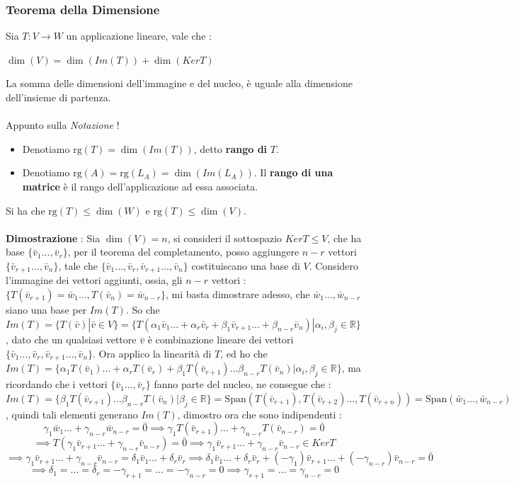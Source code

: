 \documentclass[12pt, letterpaper]{article}
\newcommand{\R}{{\mathbb R}}
\newcommand{\rg}{{\text{rg}}}
\newcommand{\ve}{{\bar v}}
\newcommand{\acc}{\\\hphantom{}\\}
\newcommand{\Span}{{\text{Span}}}
\begin{document}
\subsubsection{Teorema della Dimensione}
Sia \(T:V\rightarrow W\) un applicazione lineare, vale che :\begin{center}
    \(\dim(V)=\dim(Im(T))+\dim(KerT)\)
\end{center}
La somma delle dimensioni dell'immagine e del nucleo, è uguale alla dimensione dell'insieme di partenza.\acc
    Appunto sulla \textit{Notazione} ! \begin{itemize}
        \item Denotiamo \(\rg(T)=\dim(Im(T))\), detto \textbf{rango di }\(T\).
        \item Denotiamo \(\rg(A)=\rg(L_A)=\dim(Im(L_A))\). Il \textbf{rango di una matrice} è il rango dell'applicazione ad essa associata.
    \end{itemize}
Si ha che \(\rg(T)\le \dim(W)\) e \(\rg(T)\le\dim(V)\).\acc 
\textbf{Dimostrazione }: 
Sia \(\dim(V)=n\), si consideri il sottospazio \(KerT\le V\), che ha base \(\{\ve_1\dots,\ve_r\}\), per il teorema del completamento, posso aggiungere 
\(n-r\) vettori \(\{\ve_{r+1}\dots,\ve_n\}\), tale che \(\{\ve_1\dots,\ve_r,\ve_{r+1}\dots,\ve_n\}\) costituiscano una base 
di \(V\). Considero l'immagine dei vettori aggiunti, ossia, gli \(n-r\) vettori : \(\{T(\ve_{r+1})=\bar w_1\dots,T(\ve_n)=\bar w_{n-r}\}\),
mi basta dimostrare adesso, che \(\bar w_1\dots,\bar w_{n-r}\) siano una base per \(Im(T)\). So che \(Im(T)=\{T(\ve)|\ve\in V\}=
\{T(\alpha_1\ve_1\dots +\alpha_r\ve_r+\beta_1\ve_{r+1}\dots+\beta_{n-r}\ve_n)|\alpha_i,\beta_j\in\R\}\), dato che 
un qualsiasi vettore \(\ve\) è combinazione lineare dei vettori  \(\{\ve_1\dots,\ve_r,\ve_{r+1}\dots,\ve_n\}\). Ora applico la linearità
di \(T\), ed ho che \(Im(T)=\{\alpha_1T(\ve_1)\dots+\alpha_rT(\ve_r)+\beta_1T(\ve_{r+1})\dots\beta_{n-r}T(\ve_n)|\alpha_i,\beta_j\in\R\}\), ma 
ricordando che i vettori  \(\{\ve_1\dots,\ve_r\}\) fanno parte del nucleo, ne consegue che : 
\(Im(T)=\{\beta_1T(\ve_{r+1})\dots\beta_{n-r}T(\ve_n)|\beta_j\in\R\}=\Span(T(\ve_{r+1}),T(\ve_{r+2})\dots,T(\ve_{r+n}))=
\Span(\bar w_1\dots,\bar w_{n-r})\), quindi tali elementi generano \(Im(T)\), dimostro ora che sono indipendenti : \begin{equation}
    \gamma_1\bar w_1\dots +\gamma_{n-r}\bar w_{n-r}=\bar0\implies\gamma_1T(\ve_{r+1})\dots+\gamma_{n-r}T(\ve_{n-r})=\bar0
\end{equation}\begin{equation}\implies T(\gamma_1\ve_{r+1}\dots+\gamma_{n-r}\ve_{n-r})=\bar 0 \implies \gamma_1\ve_{r+1}\dots+\gamma_{n-r}\ve_{n-r}\in KerT 
\end{equation}\begin{equation} \implies \gamma_1\ve_{r+1}\dots+\gamma_{n-r}\ve_{n-r}=\delta_1 \ve_1\dots +\delta_r\ve_r\implies 
    \delta_1 \ve_1\dots +\delta_r\ve_r +(- \gamma_1)\ve_{r+1}\dots+(-\gamma_{n-r})\ve_{n-r}=\bar 0 
\end{equation}\begin{equation}\implies \delta_1=\dots = \delta_r=-\gamma_{r+1}=\dots=-\gamma_{n-r}=0 \implies \gamma_{r+1}=\dots=\gamma_{n-r}=0
\end{equation}
\end{document}
